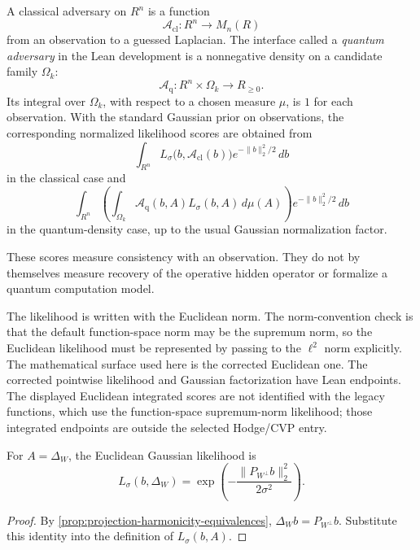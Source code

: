 \begin{definition}\label{def:adversary-likelihood-surfaces}
  A classical adversary on \(R^n\) is a function
  \[
    \mathcal A_{\mathrm{cl}}:R^n\to M_n(R)
  \]
  from an observation to a guessed Laplacian. The interface called a
  \emph{quantum adversary} in the Lean development is a nonnegative density
  on a candidate family \(\Omega_k\):
  \[
    \mathcal A_{\mathrm q}:R^n\times\Omega_k\to R_{\ge 0}.
  \]
  Its integral over \(\Omega_k\), with respect to a chosen measure \(\mu\),
  is \(1\) for each observation. With the standard Gaussian prior on
  observations, the corresponding normalized likelihood scores are obtained
  from
  \[
    \int_{R^n}
      L_\sigma\bigl(b,\mathcal A_{\mathrm{cl}}(b)\bigr)
      e^{-\|b\|_2^2/2}\,db
  \]
  in the classical case and
  \[
    \int_{R^n}
      \left(
        \int_{\Omega_k}
          \mathcal A_{\mathrm q}(b,A)L_\sigma(b,A)\,d\mu(A)
      \right)
      e^{-\|b\|_2^2/2}\,db
  \]
  in the quantum-density case, up to the usual Gaussian normalization factor.
\end{definition}

These scores measure consistency with an observation. They do not by
themselves measure recovery of the operative hidden operator or formalize a
quantum computation model.

The likelihood is written with the Euclidean norm. The norm-convention check is
that the default function-space norm may be the supremum norm, so the Euclidean
likelihood must be represented by passing to the \(\ell^2\) norm explicitly. The
mathematical surface used here is the corrected Euclidean one.
The corrected pointwise likelihood and Gaussian factorization have Lean
endpoints. The displayed Euclidean integrated scores are not identified with
the legacy  functions, which use the function-space
supremum-norm likelihood; those integrated endpoints are outside the selected
Hodge/CVP entry.

\begin{proposition}\label{prop:likelihood-projection-laplacian}
  For \(A=\Delta_W\), the Euclidean Gaussian likelihood is
  \[
    L_\sigma(b,\Delta_W)
    =
    \exp\left(
      -\frac{\|P_{W^\perp}b\|_2^2}{2\sigma^2}
    \right).
  \]
\end{proposition}

\begin{proof}
  By \cref{prop:projection-harmonicity-equivalences},
  \(\Delta_Wb=P_{W^\perp}b\). Substitute this identity into the definition of
  \(L_\sigma(b,A)\).
\end{proof}

